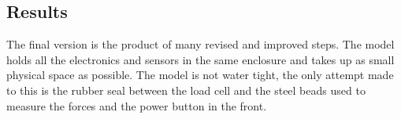 \subsection{Results}
The final version is the product of many revised and improved steps. The model holds all the electronics and sensors in the same enclosure and takes up as small physical space as possible.
The model is not water tight, the only attempt made to this is the rubber seal between the load cell and the steel beads used to measure the forces and the power button in the front.

